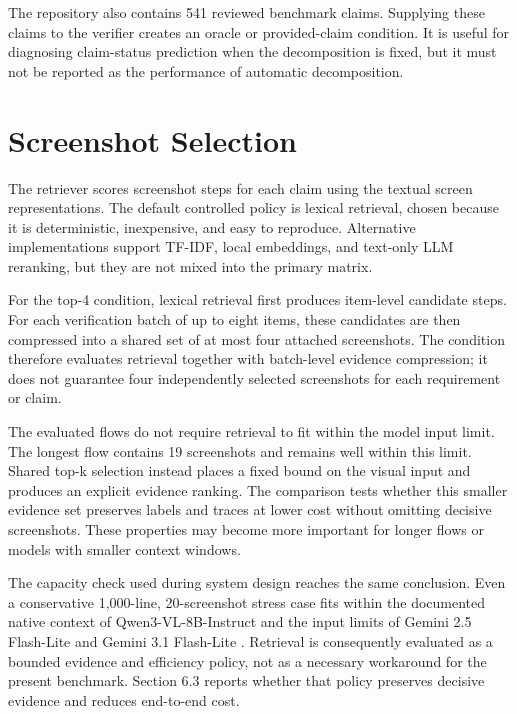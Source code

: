 The repository also contains 541 reviewed benchmark claims. Supplying these
claims to the verifier creates an oracle or provided-claim condition. It is
useful for diagnosing claim-status prediction when the decomposition is fixed,
but it must not be reported as the performance of automatic decomposition.

\section{Screenshot Selection}\label{screenshot-selection}

The retriever scores screenshot steps for each claim using the textual screen
representations. The default controlled policy is lexical retrieval, chosen
because it is deterministic, inexpensive, and easy to reproduce. Alternative
implementations support TF-IDF, local embeddings, and text-only LLM reranking,
but they are not mixed into the primary matrix.

For the top-4 condition, lexical retrieval first produces item-level candidate
steps. For each verification batch of up to eight items, these candidates are
then compressed into a shared set of at most four attached screenshots. The
condition therefore evaluates retrieval together with batch-level evidence
compression; it does not guarantee four independently selected screenshots for
each requirement or claim.

The evaluated flows do not require retrieval to fit within the model input
limit. The longest flow contains 19 screenshots and remains well within this
limit. Shared top-k selection instead places a fixed bound on the visual input and
produces an explicit evidence ranking. The comparison tests whether this
smaller evidence set preserves labels and traces at lower cost without omitting
decisive screenshots. These properties may become more important for longer
flows or models with smaller context windows.

The capacity check used during system design reaches the same conclusion. Even
a conservative 1,000-line, 20-screenshot stress case fits within the documented
native context of Qwen3-VL-8B-Instruct and the input limits of Gemini 2.5
Flash-Lite and Gemini 3.1 Flash-Lite \autocite{qwen3vl8b2025,googlegemini25flashlite2026,googlegemini31flashlite2026}. Retrieval is
consequently evaluated as a bounded evidence and efficiency policy, not as a
necessary workaround for the present benchmark. Section 6.3 reports whether
that policy preserves decisive evidence and reduces end-to-end cost.


